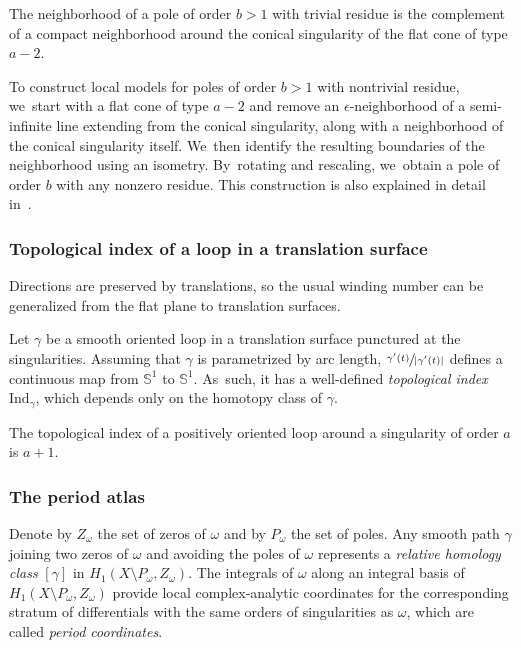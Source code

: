 The neighborhood of a pole of order $b>1$ with trivial residue is the complement of a compact neighborhood around the conical singularity of the flat cone of type $a-2$.

To construct local models for poles of order $b>1$ with nontrivial residue, we~start with a flat cone of type $a-2$ and remove an $\epsilon$-neighborhood of a semi-infinite line extending from the conical singularity, along with a neighborhood of the conical singularity itself. We~then identify the resulting boundaries of the neighborhood using an isometry. By~rotating and rescaling, we~obtain a pole of order $b$ with any nonzero residue. This construction is also explained in detail in~\cite{Bo}.

\subsubsection{Topological index of a loop in a translation surface}\label{sub:rotation}

Directions are preserved by translations, so the usual winding number can be generalized from the flat plane to translation surfaces.
\begin{defn}
Let $\gamma$ be a smooth oriented loop in a translation surface punctured at the singularities. Assuming that $\gamma$ is parametrized by arc length, $\sfrac{\gamma'(t)}{|\gamma'(t)|}$ defines a continuous map from $\mathbb{S}^{1}$ to $\mathbb{S}^{1}$. As~such, it has a well-defined \textit{topological index} $\mathrm{Ind}_{\gamma}$, which depends only on the homotopy class of $\gamma$.
\end{defn}

The topological index of a positively oriented loop around a singularity of order $a$ is $a+1$.

\label{sec:periodcoor}

\subsubsection{The period atlas}

Denote by $Z_{\omega}$ the set of zeros of $\omega$ and by $P_{\omega}$ the set of poles. Any smooth path $\gamma$ joining two zeros of $\omega$ and avoiding the poles of $\omega$ represents a \textit{relative homology class} $[\gamma]$ in $H_{1}(X \setminus P_{\omega},Z_{\omega})$. The integrals of $\omega$ along an integral basis of $H_{1}(X \setminus P_{\omega},Z_{\omega})$ provide local complex-analytic coordinates for the corresponding stratum of differentials with the same orders of singularities as $\omega$, which are called {\em period coordinates}.

